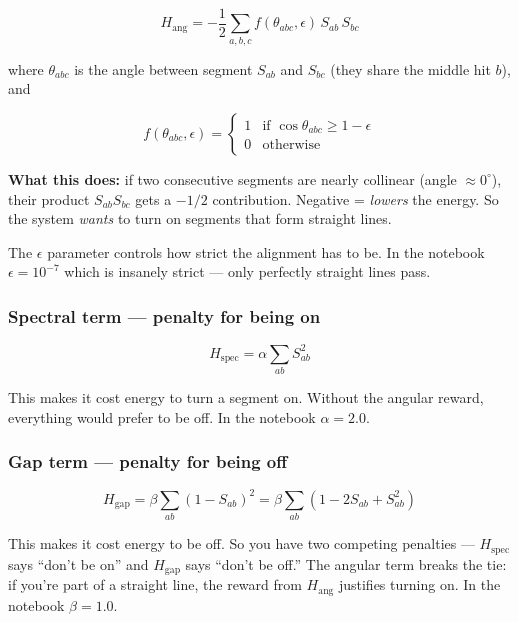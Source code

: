 \documentclass[11pt, a4paper]{article}
\begin{document}
\begin{equation}
  H_{\text{ang}} = -\frac{1}{2}\sum_{a,b,c}
  f(\theta_{abc},\epsilon)\, S_{ab}\, S_{bc}
\end{equation}

where $\theta_{abc}$ is the angle between segment $S_{ab}$ and $S_{bc}$
(they share the middle hit $b$), and

\[
  f(\theta_{abc}, \epsilon) = \begin{cases}
    1 & \text{if } \cos\theta_{abc} \geq 1 - \epsilon \\
    0 & \text{otherwise} \end{cases}
\]

\begin{tcolorbox}[nb]
\textbf{What this does:} if two consecutive segments are nearly
collinear (angle $\approx 0^\circ$), their product $S_{ab}S_{bc}$ gets a
$-1/2$ contribution. Negative = \emph{lowers} the energy. So the system
\emph{wants} to turn on segments that form straight lines.

The $\epsilon$ parameter controls how strict the alignment has to be. In
the notebook $\epsilon = 10^{-7}$ which is insanely strict --- only
perfectly straight lines pass.
\end{tcolorbox}

\subsubsection{Spectral term --- penalty for being on}

\begin{equation}
  H_{\text{spec}} = \alpha \sum_{ab} S_{ab}^2
\end{equation}

This makes it cost energy to turn a segment on. Without the angular reward,
everything would prefer to be off. In the notebook $\alpha = 2.0$.

\subsubsection{Gap term --- penalty for being off}

\begin{equation}
  H_{\text{gap}} = \beta \sum_{ab}(1 - S_{ab})^2
  = \beta \sum_{ab}(1 - 2S_{ab} + S_{ab}^2)
\end{equation}

This makes it cost energy to be off. So you have two competing penalties ---
$H_{\text{spec}}$ says ``don't be on'' and $H_{\text{gap}}$ says ``don't be
off.'' The angular term breaks the tie: if you're part of a straight line,
the reward from $H_{\text{ang}}$ justifies turning on. In the notebook
$\beta = 1.0$.
\end{document}
